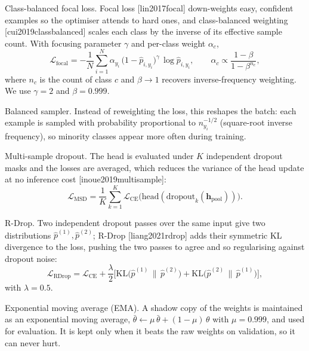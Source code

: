 \documentclass[11pt,a4paper]{article}
\def\citep#1{[#1]}%
\def\emph#1{#1}%
\begin{document}
\emph{Class-balanced focal loss.} Focal loss \citep{lin2017focal} down-weights easy, confident examples so the optimiser attends to hard ones, and class-balanced weighting \citep{cui2019classbalanced} scales each class by the inverse of its effective sample count. With focusing parameter $\gamma$ and per-class weight $\alpha_c$,
\begin{equation}
\mathcal{L}_{\mathrm{focal}} = -\frac{1}{N}\sum_{i=1}^{N} \alpha_{y_i}\,\big(1 - \hat{p}_{i,y_i}\big)^{\gamma}\,\log \hat{p}_{i,y_i},
\qquad
\alpha_c \propto \frac{1 - \beta}{1 - \beta^{n_c}},
\label{eq:focal}
\end{equation}
where $n_c$ is the count of class $c$ and $\beta \to 1$ recovers inverse-frequency weighting. We use $\gamma = 2$ and $\beta = 0.999$.

\emph{Balanced sampler.} Instead of reweighting the loss, this reshapes the batch: each example is sampled with probability proportional to $n_{y_i}^{-1/2}$ (square-root inverse frequency), so minority classes appear more often during training.

\emph{Multi-sample dropout.} The head is evaluated under $K$ independent dropout masks and the losses are averaged, which reduces the variance of the head update at no inference cost \citep{inoue2019multisample}:
\begin{equation}
\mathcal{L}_{\mathrm{MSD}} = \frac{1}{K}\sum_{k=1}^{K} \mathcal{L}_{\mathrm{CE}}\!\big(\mathrm{head}(\mathrm{dropout}_k(\mathbf{h}_{\mathrm{pool}}))\big).
\label{eq:msd}
\end{equation}

\emph{R-Drop.} Two independent dropout passes over the same input give two distributions $\hat{p}^{(1)}, \hat{p}^{(2)}$; R-Drop \citep{liang2021rdrop} adds their symmetric KL divergence to the loss, pushing the two passes to agree and so regularising against dropout noise:
\begin{equation}
\mathcal{L}_{\mathrm{RDrop}} = \mathcal{L}_{\mathrm{CE}} + \frac{\lambda}{2}\Big[\mathrm{KL}\big(\hat{p}^{(1)} \,\|\, \hat{p}^{(2)}\big) + \mathrm{KL}\big(\hat{p}^{(2)} \,\|\, \hat{p}^{(1)}\big)\Big],
\label{eq:rdrop}
\end{equation}
with $\lambda = 0.5$.

\emph{Exponential moving average (EMA).} A shadow copy of the weights is maintained as an exponential moving average, $\bar{\theta} \leftarrow \mu\,\bar{\theta} + (1-\mu)\,\theta$ with $\mu = 0.999$, and used for evaluation. It is kept only when it beats the raw weights on validation, so it can never hurt.
\end{document}
